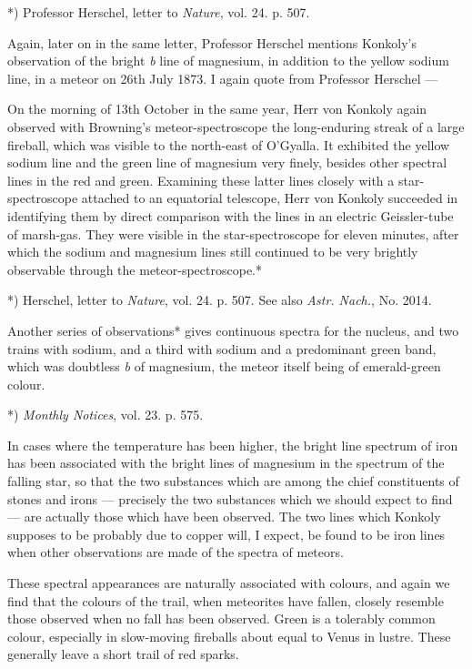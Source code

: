 \documentclass[a4paper, 12pt, oneside, polutonikogreek, english]{article}
\begin{document}
*) Professor Herschel, letter to \emph{Nature}, vol. 24. p. 507.

Again, later on in the same letter, Professor Herschel mentions Konkoly's observation of the bright \emph{b} line of magnesium, in addition to the yellow sodium line, in a meteor on 26th July 1873. I again quote from Professor Herschel ---

On the morning of 13th October in the same year, Herr von Konkoly again observed with Browning's meteor-spectroscope the long-enduring streak of a large fireball, which was visible to the north-east of O'Gyalla. It exhibited the yellow sodium line and the green line of magnesium very finely, besides other spectral lines in the red and green. Examining these latter lines closely with a star-spectroscope attached to an equatorial telescope, Herr von Konkoly succeeded in identifying them by direct comparison with the lines in an electric Geissler-tube of marsh-gas. They were visible in the star-spectroscope for eleven minutes, after which the sodium and magnesium lines still continued to be very brightly observable through the meteor-spectroscope.*

*) Herschel, letter to \emph{Nature}, vol. 24. p. 507. See also \emph{Astr. Nach.}, No. 2014.

Another series of observations* gives continuous spectra for the nucleus, and two trains with sodium, and a third with sodium and a predominant green band, which was doubtless \emph{b} of magnesium, the meteor itself being of emerald-green colour.

*) \emph{Monthly Notices}, vol. 23. p. 575.

In cases where the temperature has been higher, the bright line spectrum of iron has been associated with the bright lines of magnesium in the spectrum of the falling star, so that the two substances which are among the chief constituents of stones and irons --- precisely the two substances which we should expect to find --- are actually those which have been observed. The two lines which Konkoly supposes to be probably due to copper will, I expect, be found to be iron lines when other observations are made of the spectra of meteors.

These spectral appearances are naturally associated with colours, and again we find that the colours of the trail, when meteorites have fallen, closely resemble those observed when no fall has been observed. Green is a tolerably common colour, especially in slow-moving fireballs about equal to Venus in lustre. These generally leave a short trail of red sparks.
\end{document}

